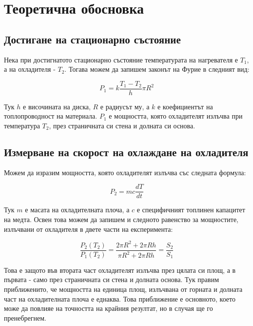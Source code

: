 \documentclass[reprint,amsmath,amssymb,aps,floatfix]{revtex4-2}
\begin{document}
\section{Теоретична обосновка}
\subsection{Достигане на стационарно състояние}

Нека при достигнатото стационарно състояние температурата на нагревателя е $T_1$, а на охладителя - $T_2$. Тогава можем да запишем законът на Фурие в следният вид:

\begin{equation*} \label{eq:1}
    P_1 = k\frac{T_1 - T_2}{h} \pi R^2 \tag{1}
\end{equation*}

Тук $h$ е височината на диска, $R$ е радиусът му, а $k$ е коефициентът на топлопроводност на материала. $P_1$ е мощността, която охладителят излъчва при температура $T_2$, през страничната си стена и долната си основа.

\subsection{Измерване на скорост на охлаждане на охладителя}

Можем да изразим мощността, която охладителят излъчва със следната формула: 

\begin{equation*} \label{eq:2}
    P_2 = m c \frac{dT}{dt} \tag{2}
\end{equation*}

Тук $m$ е масата на охладителната плоча, а $c$ е специфичният топлинен капацитет на медта. Освен това можем да запишем и следното равенство за мощностите, излъчвани от охладителя в двете части на експеримента: 

\begin{equation*} \label{eq:3}
    \frac{P_2(T_2)}{P_1(T_2)} = \frac{2\pi R^2 + 2\pi Rh}{\pi R^2 + 2\pi Rh} = \frac{S_2}{S_1} \tag{3}
\end{equation*}


Това е защото във втората част охладителят излъчва през цялата си площ, а в първата - само през страничната си стена и долната основа. Тук правим приближенито, че мощността на единица площ, излъчвана от горната и долната част на охладителната плоча е еднаква. Това приближение е основното, което може да повлияе на точността на крайния резултат, но в случая ще го пренебрегнем.
\end{document}
